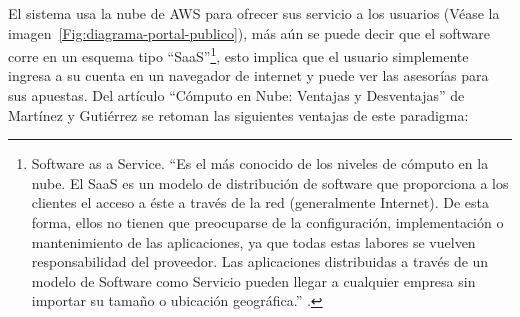 El sistema usa la nube de AWS para ofrecer sus servicio a los usuarios (Véase la imagen~\ref{Fig:diagrama-portal-publico}), más aún se puede decir que el software corre en un esquema tipo ``SaaS''\footnote{Software as a Service. ``Es el más conocido de los niveles de cómputo en la nube. El SaaS es un modelo de distribución de software que proporciona a los clientes el acceso a éste a través de la red (generalmente Internet). De esta forma, ellos no tienen que preocuparse de la configuración, implementación o mantenimiento de las aplicaciones, ya que todas estas labores se vuelven responsabilidad del proveedor. Las aplicaciones distribuidas a través de un modelo de Software como Servicio pueden llegar a cualquier empresa sin importar su tamaño o ubicación geográfica.'' \cite{godinez2010nube}.}, esto implica que el usuario simplemente ingresa a su cuenta en un navegador de internet y puede ver las asesorías para sus apuestas.
Del artículo ``Cómputo en Nube: Ventajas y Desventajas'' de Martínez y Gutiérrez \cite{godinez2010nube}  se retoman las siguientes ventajas de este paradigma:
